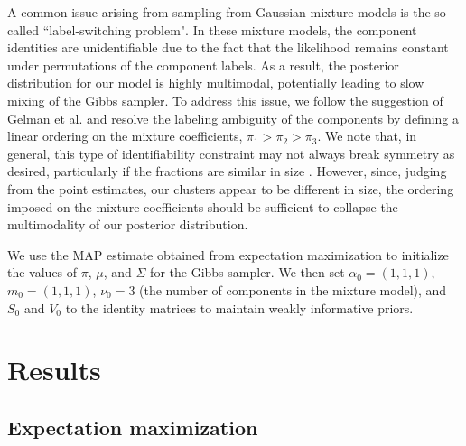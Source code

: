 \documentclass[twoside]{article}
\theoremstyle{theorem}
\theoremstyle{theorem}
\theoremstyle{theorem}
\theoremstyle{lemma}
\theoremstyle{definition}
\theoremstyle{example}
\begin{document}
A common issue arising from sampling from Gaussian mixture models is the so-called ``label-switching problem". In these mixture models, the component identities are unidentifiable due to the fact that the likelihood remains constant under permutations of the component labels. As a result, the posterior distribution for our model is highly multimodal, potentially leading to slow mixing of the Gibbs sampler. To address this issue, we follow the suggestion of Gelman et al. \cite{Gelman} and  resolve the labeling ambiguity of the components by defining a linear ordering on the mixture coefficients, $\pi_1 > \pi_2 > \pi_3$. We note that, in general, this type of identifiability constraint may not always break symmetry as desired, particularly if the fractions are similar in size \cite{Stephens}. However, since, judging from the point estimates, our clusters appear to be different in size, the ordering imposed on the mixture coefficients should be sufficient to collapse the multimodality of our posterior distribution.

We use the MAP estimate obtained from expectation maximization to initialize the values of $\pi$, $\mu$, and $\Sigma$ for the Gibbs sampler. We then set $\alpha_0 = (1,1,1)$, $m_0 = (1,1,1)$, $\nu_0 = 3$ (the number of components in the mixture model), and $S_0$ and $V_0$ to the identity matrices to maintain weakly informative priors.   

\section{Results}

\subsection{Expectation maximization}
\end{document}
